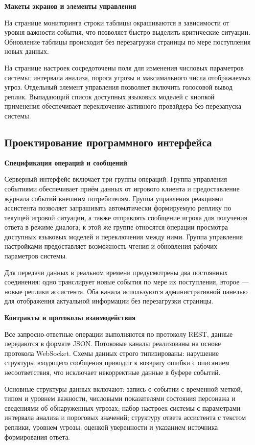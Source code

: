 \textbf{Макеты экранов и элементы управления}

На странице мониторинга строки таблицы окрашиваются в зависимости от уровня важности события, что позволяет быстро выделить критические ситуации. Обновление таблицы происходит без перезагрузки страницы по мере поступления новых данных.

На странице настроек сосредоточены поля для изменения числовых параметров системы: интервала анализа, порога угрозы и максимального числа отображаемых угроз. Отдельный элемент управления позволяет включить голосовой вывод реплик. Выпадающий список доступных языковых моделей с кнопкой применения обеспечивает переключение активного провайдера без перезапуска системы.

\subsection{Проектирование программного интерфейса}

\textbf{Спецификация операций и сообщений}

Серверный интерфейс включает три группы операций. Группа управления событиями обеспечивает приём данных от игрового клиента и предоставление журнала событий внешним потребителям. Группа управления реакциями ассистента позволяет запрашивать автоматически формируемую реплику по текущей игровой ситуации, а также отправлять сообщение игрока для получения ответа в режиме диалога; к этой же группе относятся операции просмотра доступных языковых моделей и переключения между ними. Группа управления настройками предоставляет возможность чтения и обновления рабочих параметров системы.

Для передачи данных в реальном времени предусмотрены два постоянных соединения: одно транслирует новые события по мере их поступления, второе — новые реплики ассистента. Оба канала используются административной панелью для отображения актуальной информации без перезагрузки страницы.

\textbf{Контракты и протоколы взаимодействия}

Все запросно-ответные операции выполняются по протоколу REST, данные передаются в формате JSON. Потоковые каналы реализованы на основе протокола WebSocket. Схемы данных строго типизированы: нарушение структуры входящего сообщения приводит к возврату ошибки с описанием несоответствия, что исключает некорректные данные в буфере событий.

Основные структуры данных включают: запись о событии с временной меткой, типом и уровнем важности, числовыми показателями состояния персонажа и сведениями об обнаруженных угрозах; набор настроек системы с параметрами интервала анализа и пороговых значений; структуру ответа ассистента с текстом реплики, уровнем угрозы, оценкой уверенности и указанием источника формирования ответа.

